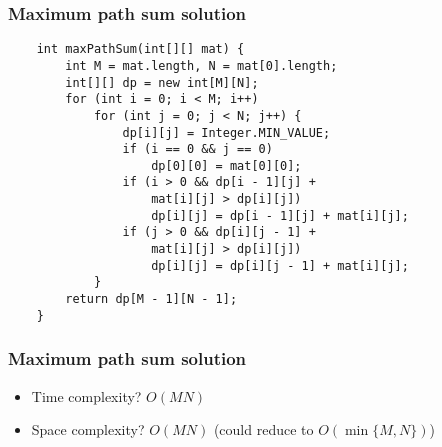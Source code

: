 \documentclass[t]{beamer}
\begin{document}
\begin{frame}[fragile]

    \frametitle{Maximum path sum solution}
    
    \begin{verbatim}
    int maxPathSum(int[][] mat) {
        int M = mat.length, N = mat[0].length;
        int[][] dp = new int[M][N];
        for (int i = 0; i < M; i++)
            for (int j = 0; j < N; j++) {
                dp[i][j] = Integer.MIN_VALUE;
                if (i == 0 && j == 0)
                    dp[0][0] = mat[0][0];
                if (i > 0 && dp[i - 1][j] +
                    mat[i][j] > dp[i][j])
                    dp[i][j] = dp[i - 1][j] + mat[i][j];
                if (j > 0 && dp[i][j - 1] +
                    mat[i][j] > dp[i][j])
                    dp[i][j] = dp[i][j - 1] + mat[i][j];
            }
        return dp[M - 1][N - 1];
    }
    \end{verbatim}

\end{frame}

\begin{frame}
    
    \frametitle{Maximum path sum solution}

    \begin{itemize}

        \item

        Time complexity? \pause $O(MN)$ \pause

        \item

        Space complexity? \pause $O(MN)$ \pause (could reduce to $O(\min \{M, N\})$)

    \end{itemize}

\end{frame}
\end{document}
